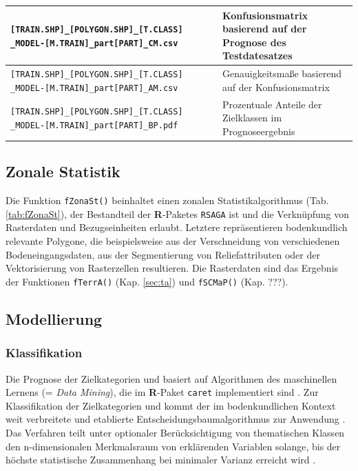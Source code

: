 \begin{table}[p]
\begin{tabularx}{\textwidth}{X|X}
		\texttt{[TRAIN.SHP]\_[POLYGON.SHP]\_[T.CLASS] \_MODEL-[M.TRAIN]\_part[PART]\_CM.csv} & Konfusionsmatrix basierend auf der Prognose des Testdatesatzes\\\midrule
		\texttt{[TRAIN.SHP]\_[POLYGON.SHP]\_[T.CLASS] \_MODEL-[M.TRAIN]\_part[PART]\_AM.csv} & Genauigkeitsmaße basierend auf der Konfusionsmatrix\\\midrule
        \texttt{[TRAIN.SHP]\_[POLYGON.SHP]\_[T.CLASS] \_MODEL-[M.TRAIN]\_part[PART]\_BP.pdf} & Prozentuale Anteile der Zielklassen im Prognoseergebnis\\\bottomrule
		\end{tabularx}%
	\label{tab:fClasP}%
\end{table}




\subsection{Zonale Statistik}
Die Funktion \texttt{fZonaSt()} beinhaltet einen zonalen Statistikalgorithmus (Tab. \ref{tab:fZonaSt}), der Bestandteil der 
 \textbf{R}-Paketes \texttt{RSAGA} \citep{Brenning-etal2018} ist und die Verknüpfung von Rasterdaten und Bezugseinheiten erlaubt. Letztere repräsentieren bodenkundlich relevante Polygone, die beispielsweise aus der Verschneidung von verschiedenen Bodeneingangsdaten, aus der Segmentierung von Reliefattributen oder der Vektorisierung von Rasterzellen resultieren. Die Rasterdaten sind das Ergebnis der Funktionen \texttt{fTerrA()} (Kap. \ref{sec:ta}) und \texttt{fSCMaP()} (Kap. ???). 


\subsection{Modellierung}
\subsubsection{Klassifikation}
Die Prognose der Zielkategorien  und  basiert auf Algorithmen des maschinellen Lernens (= \textit{Data Mining}), die im \textbf{R}-Paket \texttt{caret} implementiert sind \citep{Kuhn2008jss,KuhnJohnson2013apm}. Zur Klassifikation der Zielkategorien  und  kommt der im bodenkundlichen Kontext weit verbreitete und etablierte Entscheidungsbaumalgorithmus  zur Anwendung \citep{Behrens-etal2018sr,Taghizadeh-Mehrjardi-etal2020}. Das Verfahren teilt unter optionaler Berücksichtigung von thematischen Klassen den n-dimensionalen Merkmalsraum von erklärenden Variablen solange, bis der höchste statistische Zusammenhang bei minimaler Varianz erreicht wird \citep{Breiman2001,LiawWiener2002}.\

